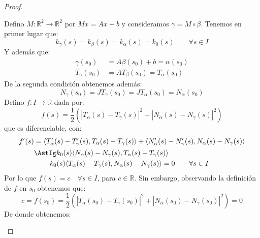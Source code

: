 \begin{teo}
\begin{proof}
\begin{description}
\begin{equation*}
                \end{equation*}
                Defino $M:\mathbb{R}^2\to \mathbb{R}^2$ por $Mx = Ax+b$ y consideramos $\gamma = M\circ \beta$. Tenemos en primer lugar que:
                \begin{equation*}
                    k_\gamma(s) = k_\beta(s) = k_\alpha(s) = k_0(s) \qquad \forall s\in I
                \end{equation*}
                Y además que:
                \begin{align*}
                    \gamma(s_0) &= A\beta(s_0) + b = \alpha(s_0) \\
                    T_\gamma(s_0) &= AT_\beta(s_0) = T_\alpha(s_0)
                \end{align*}
                De la segunda condición obtenemos además: 
                \begin{equation*}
                    N_\gamma(s_0) = JT_\gamma(s_0) = JT_\alpha(s_0) = N_\alpha(s_0)
                \end{equation*}
                Defino $f:I\to \mathbb{R}$ dada por:
                \begin{equation*}
                    f(s) = \frac{1}{2}\left(|T_{\alpha}(s) - T_\gamma(s)|^2 + |N_\alpha(s) - N_\gamma(s)|^2\right)
                \end{equation*}
                que es diferenciable, con:
                \begin{align*}
                    f'(s) &= \langle T_\alpha'(s) - T_\gamma'(s), T_\alpha(s)-T_\gamma(s) \rangle + \langle N_\alpha'(s) - N_\gamma'(s), N_\alpha(s)-N_\gamma(s) \rangle  \\
                          &\AstIg k_0(s)\langle N_\alpha(s)-N_\gamma(s), T_\alpha(s)-T_\gamma(s) \rangle \\
                          &\quad - k_0(s) \langle T_\alpha(s)-T_\gamma(s),N_\alpha(s)-N_\gamma(s) \rangle  = 0 \qquad \forall s\in I
                \end{align*}
                Por lo que $f(s) = c\quad \forall s\in I$, para $c\in \mathbb{R}$. Sin embargo, observando la definición de $f$ en $s_0$ obtenemos que:
                \begin{equation*}
                    c = f(s_0) = \frac{1}{2}\left(|T_\alpha(s_0)-T_\gamma(s_0)|^2 + |N_\alpha(s_0)-N_\gamma(s_0)|^2\right) = 0 
                \end{equation*}
                De donde obtenemos: 
                \begin{equation*}

\end{equation*}
\end{description}
\end{proof}
\end{teo}
